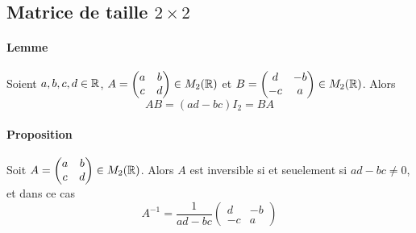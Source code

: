 %
\subsection{Matrice de taille $2\times 2$}
%
\paragraph{Lemme} Soient $a, b, c, d \in \mathbb{R}$, $A = \begin{pmatrix} a & b \\ c & d \end{pmatrix} \in M_{2}(\mathbb{R})$ et $B = \begin{pmatrix} d & -b \\ -c & a \end{pmatrix} \in M_{2}(\mathbb{R})$. Alors 
$$A B = (a d - b c) I_2 = B A$$


\paragraph{Proposition} Soit $A = \begin{pmatrix} a & b \\ c & d \end{pmatrix} \in M_{2}(\mathbb{R})$. Alors $A$ est inversible si et seuelement si $a d - b c \neq 0$, et dans ce cas
$$A^{-1} = \frac{1}{a d - b c} \begin{pmatrix} d & -b \\ -c & a \end{pmatrix}$$

